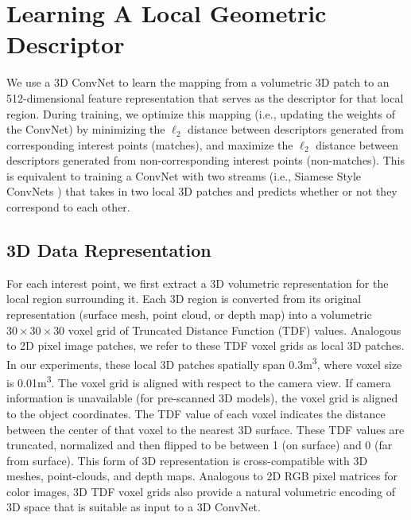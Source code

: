 \documentclass[10pt,twocolumn,letterpaper]{article}
\begin{document}
\section{Learning A Local Geometric Descriptor}
We use a 3D ConvNet to learn the mapping from a volumetric 3D patch to an 512-dimensional feature representation that serves as the descriptor for that local region.
During training, we optimize this mapping (i.e., updating the weights of the ConvNet) by minimizing the $\ell_2$ distance between descriptors generated from corresponding interest points (matches), and maximize the $\ell_2$ distance between descriptors generated from non-corresponding interest points (non-matches). This is equivalent to training a ConvNet with two streams (i.e., Siamese Style ConvNets \cite{chopra2005learning}) that takes in two local 3D patches and predicts whether or not they correspond to each other. 


\subsection{3D Data Representation}
\label{sec:data-representation}
For each interest point, we first extract a 3D volumetric representation for the local region surrounding it. Each 3D region is converted from its original representation (surface mesh, point cloud, or depth map) into a volumetric $30\times{30}\times{30}$ voxel grid of Truncated Distance Function (TDF) values. Analogous to 2D pixel image patches, we refer to these TDF voxel grids as local 3D patches. In our experiments, these local 3D patches spatially span 0.3m\textsuperscript{3}, where voxel size is 0.01m\textsuperscript{3}. The voxel grid is aligned with respect to the camera view. If camera information is unavailable (\ie for pre-scanned 3D models), the voxel grid is aligned to the object coordinates. The TDF value of each voxel indicates the distance between the center of that voxel to the nearest 3D surface. These TDF values are truncated, normalized and then flipped to be between 1 (on surface) and 0 (far from surface). This form of 3D representation is cross-compatible with 3D meshes, point-clouds, and depth maps. Analogous to 2D RGB pixel matrices for color images, 3D TDF voxel grids also provide a natural volumetric encoding of 3D space that is suitable as input to a 3D ConvNet.
\end{document}
